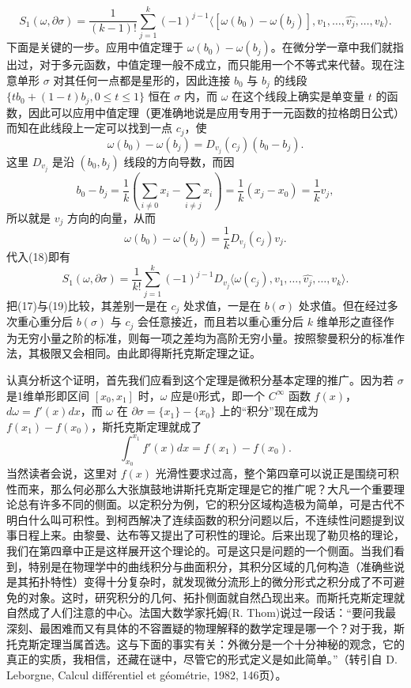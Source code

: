 \[
 S_1(\omega,\partial\sigma)
 =\frac1{(k-1)!}\sum_{j=1}^k(-1)^{j-1}
 \langle[\omega(b_0)-\omega(b_j)],v_1,\ldots,\widehat{v_j},\ldots,v_k\rangle.
\]
下面是关键的一步。应用中值定理于 $\omega(b_0)-\omega(b_j)$。在微分学一章中我们就指出过，对于多元函数，中值定理一般不成立，而只能用一个不等式来代替。现在注意单形 $\sigma$ 对其任何一点都是星形的，因此连接 $b_0$ 与 $b_j$ 的线段 $\{tb_0+(1-t)b_j,0\le t\le1\}$ 恒在 $\sigma$ 内，而 $\omega$ 在这个线段上确实是单变量 $t$ 的函数，因此可以应用中值定理（更准确地说是应用专用于一元函数的拉格朗日公式）而知在此线段上一定可以找到一点 $c_j$，使
\[
 \omega(b_0)-\omega(b_j)=D_{v_j}(c_j)(b_0-b_j).
\]
这里 $D_{v_j}$ 是沿 $(b_0,b_j)$ 线段的方向导数，而因
\[
 b_0-b_j=\frac1k\left(\sum_{i\ne0}x_i-\sum_{i\ne j}x_i\right)
 =\frac1k(x_j-x_0)=\frac1k v_j,
\]
所以就是 $v_j$ 方向的向量，从而
\[
 \omega(b_0)-\omega(b_j)=\frac1kD_{v_j}(c_j)v_j.
\]
代入(18)即有
\begin{equation}
 S_1(\omega,\partial\sigma)
 =\frac1{k!}\sum_{j=1}^k(-1)^{j-1}
 D_{v_j}\langle\omega(c_j),v_1,\ldots,\widehat{v_j},\ldots,v_k\rangle.
 \tag{19}
\end{equation}
把(17)与(19)比较，其差别一是在 $c_j$ 处求值，一是在 $b(\sigma)$ 处求值。但在经过多次重心重分后 $b(\sigma)$ 与 $c_j$ 会任意接近，而且若以重心重分后 $k$ 维单形之直径作为无穷小量之阶的标准，则每一项之差均为高阶无穷小量。按照黎曼积分的标准作法，其极限又会相同。由此即得斯托克斯定理之证。

认真分析这个证明，首先我们应看到这个定理是微积分基本定理的推广。因为若 $\sigma$ 是1维单形即区间 $[x_0,x_1]$ 时，$\omega$ 应是0形式，即一个 $C^\infty$ 函数 $f(x)$，$d\omega=f'(x)dx$，而 $\omega$ 在 $\partial\sigma=\{x_1\}-\{x_0\}$ 上的“积分”现在成为 $f(x_1)-f(x_0)$，斯托克斯定理就成了
\[
 \int_{x_0}^{x_1}f'(x)dx=f(x_1)-f(x_0).
\]
当然读者会说，这里对 $f(x)$ 光滑性要求过高，整个第四章可以说正是围绕可积性而来，那么何必那么大张旗鼓地讲斯托克斯定理是它的推广呢？大凡一个重要理论总有许多不同的侧面。以定积分为例，它的积分区域构造极为简单，可是古代不明白什么叫可积性。到柯西解决了连续函数的积分问题以后，不连续性问题提到议事日程上来。由黎曼、达布等又提出了可积性的理论。后来出现了勒贝格的理论，我们在第四章中正是这样展开这个理论的。可是这只是问题的一个侧面。当我们看到，特别是在物理学中的曲线积分与曲面积分，其积分区域的几何构造（准确些说是其拓扑特性）变得十分复杂时，就发现微分流形上的微分形式之积分成了不可避免的对象。这时，研究积分的几何、拓扑侧面就自然凸现出来。而斯托克斯定理就自然成了人们注意的中心。法国大数学家托姆(R. Thom)说过一段话：“要问我最深刻、最困难而又有具体的不容置疑的物理解释的数学定理是哪一个？对于我，斯托克斯定理当属首选。这与下面的事实有关：外微分是一个十分神秘的观念，它的真正的实质，我相信，还藏在谜中，尽管它的形式定义是如此简单。”（转引自 D. Leborgne, Calcul différentiel et géométrie, 1982, 146页）。

